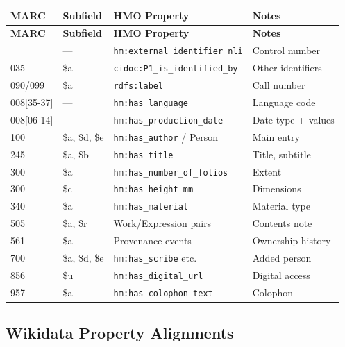 \documentclass[12pt]{article}
\newcommand{\code}[1]{\texttt{#1}}
\begin{document}
\begin{longtable}{|l|l|l|p{5cm}|}
\hline
\textbf{MARC} & \textbf{Subfield} & \textbf{HMO Property} & \textbf{Notes} \\
\hline
\endfirsthead
\hline
\textbf{MARC} & \textbf{Subfield} & \textbf{HMO Property} & \textbf{Notes} \\
\hline
\endhead
\hline
\endfoot
001 & --- & \code{hm:external\_identifier\_nli} & Control number \\
\hline
035 & \$a & \code{cidoc:P1\_is\_identified\_by} & Other identifiers \\
\hline
090/099 & \$a & \code{rdfs:label} & Call number \\
\hline
008[35-37] & --- & \code{hm:has\_language} & Language code \\
\hline
008[06-14] & --- & \code{hm:has\_production\_date} & Date type + values \\
\hline
100 & \$a, \$d, \$e & \code{hm:has\_author} / Person & Main entry \\
\hline
245 & \$a, \$b & \code{hm:has\_title} & Title, subtitle \\
\hline
300 & \$a & \code{hm:has\_number\_of\_folios} & Extent \\
\hline
300 & \$c & \code{hm:has\_height\_mm} & Dimensions \\
\hline
340 & \$a & \code{hm:has\_material} & Material type \\
\hline
505 & \$a, \$r & Work/Expression pairs & Contents note \\
\hline
561 & \$a & Provenance events & Ownership history \\
\hline
700 & \$a, \$d, \$e & \code{hm:has\_scribe} etc. & Added person \\
\hline
856 & \$u & \code{hm:has\_digital\_url} & Digital access \\
\hline
957 & \$a & \code{hm:has\_colophon\_text} & Colophon \\
\hline
\end{longtable}

\subsection{Wikidata Property Alignments}
\end{document}
